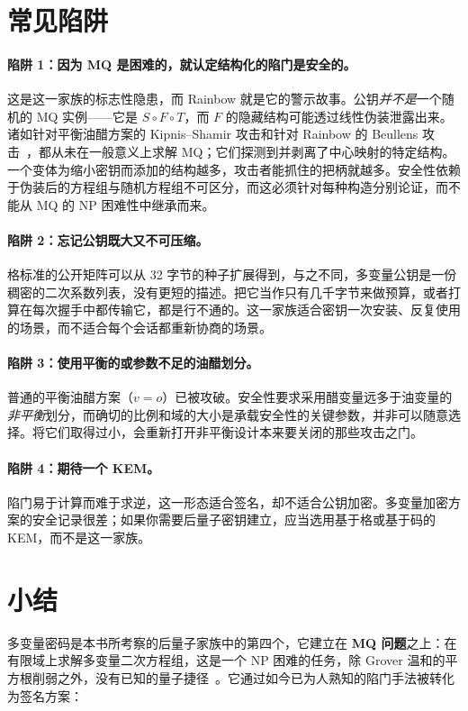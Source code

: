 \section{常见陷阱}

\paragraph{陷阱 1：因为 MQ 是困难的，就认定结构化的陷门是安全的。}
这是这一家族的标志性隐患，而 Rainbow 就是它的警示故事。公钥\emph{并不是}一个随机的 MQ 实例——它是 $S \circ F \circ T$，而 $F$ 的隐藏结构可能透过线性伪装泄露出来。诸如针对平衡油醋方案的 Kipnis--Shamir 攻击和针对 Rainbow 的 Beullens 攻击~\cite{beullens2022}，都从未在一般意义上求解 MQ；它们探测到并剥离了中心映射的特定结构。一个变体为缩小密钥而添加的结构越多，攻击者能抓住的把柄就越多。安全性依赖于伪装后的方程组与随机方程组不可区分，而这必须针对每种构造分别论证，而不能从 MQ 的 NP 困难性中继承而来。

\paragraph{陷阱 2：忘记公钥既大又不可压缩。}
格标准的公开矩阵可以从 32 字节的种子扩展得到，与之不同，多变量公钥是一份稠密的二次系数列表，没有更短的描述。把它当作只有几千字节来做预算，或者打算在每次握手中都传输它，都是行不通的。这一家族适合密钥一次安装、反复使用的场景，而不适合每个会话都重新协商的场景。

\paragraph{陷阱 3：使用平衡的或参数不足的油醋划分。}
普通的平衡油醋方案（$v = o$）已被攻破。安全性要求采用醋变量远多于油变量的\emph{非平衡}划分，而确切的比例和域的大小是承载安全性的关键参数，并非可以随意选择。将它们取得过小，会重新打开非平衡设计本来要关闭的那些攻击之门。

\paragraph{陷阱 4：期待一个 KEM。}
陷门易于计算而难于求逆，这一形态适合签名，却不适合公钥加密。多变量加密方案的安全记录很差；如果你需要后量子密钥建立，应当选用基于格或基于码的 KEM，而不是这一家族。

\section{小结}

多变量密码是本书所考察的后量子家族中的第四个，它建立在 \textbf{MQ 问题}之上：在有限域上求解多变量二次方程组，这是一个 NP 困难的任务，除 Grover 温和的平方根削弱之外，没有已知的量子捷径~\cite{ding2006}。它通过如今已为人熟知的陷门手法被转化为签名方案：

